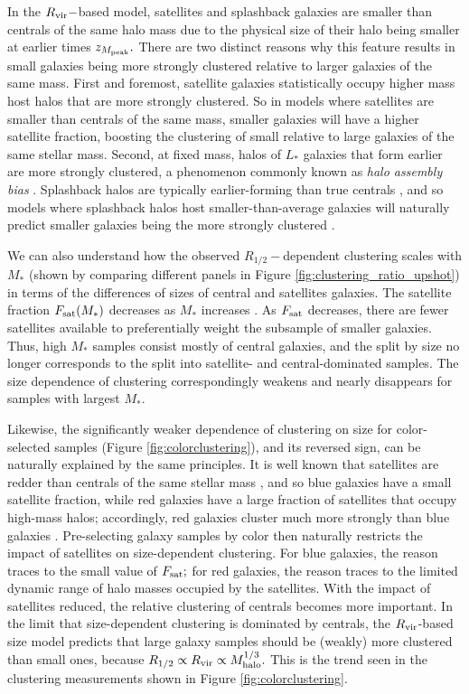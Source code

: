 \documentclass[usenatbib,usegraphicx,letterpaper]{mn2e}
\newcommand{\rhalf}{R_{1/2}}
\newcommand{\mstar}{M_{\ast}}
\newcommand{\zpeak}{z_{M_{\rm peak}}}
\newcommand{\mhalo}{M_{\rm halo}}
\newcommand{\rvir}{R_{\rm vir}}
\begin{document}
In the $\rvir-$based model, satellites and splashback galaxies are smaller than centrals of the same halo mass due to the physical size of their halo being smaller at earlier times $\zpeak.$ There are two distinct reasons why this feature results in small galaxies being more strongly clustered relative to larger galaxies of the same mass. First and foremost, satellite galaxies statistically occupy higher mass host halos that are more strongly clustered. So in models where satellites are smaller than centrals of the same mass, smaller galaxies will have a higher satellite fraction, boosting the clustering of small relative to large galaxies of the same stellar mass. Second, at fixed mass, halos of $L_\ast$ galaxies that form earlier are more strongly clustered, a phenomenon commonly known as {\em halo assembly bias} \citep{gao_white05,wechsler_etal06}. Splashback halos are typically earlier-forming than true centrals \citep{wang_etal09}, and so models where splashback halos host smaller-than-average galaxies will naturally predict smaller galaxies being the more strongly clustered \citep[see][for an example of the splashback-dependence of halo clustering]{sunayama_etal16}.

We can also understand how the observed $\rhalf-$dependent clustering scales with $\mstar$ (shown by comparing different panels in Figure \ref{fig:clustering_ratio_upshot}) in terms of the differences of sizes of central and satellites galaxies. The satellite fraction $F_{\rm sat}(\mstar)$ decreases as $\mstar$ increases \citep[e.g.,][]{guo_etal11,reddick_etal13}. As $F_{\rm sat}$ decreases, there are fewer satellites available to preferentially weight the subsample of smaller galaxies. Thus,  high $\mstar$ samples consist mostly of central galaxies, and the split by size no longer corresponds to the split into satellite- and central-dominated samples. The size dependence of clustering correspondingly weakens and nearly disappears for samples with largest $\mstar$.

Likewise, the significantly weaker dependence of clustering on size for color-selected samples (Figure \ref{fig:colorclustering}), and its reversed sign, can be naturally explained by the same principles.  It is well known that satellites are redder than centrals of the same stellar mass \citep[e.g.,][]{vdB_etal08}, and so blue galaxies have a small satellite fraction, while red galaxies have a large fraction of satellites that occupy high-mass halos; accordingly, red galaxies cluster much more strongly than blue galaxies \citep[e.g.,][]{zehavi_etal11}. Pre-selecting galaxy samples by color then naturally restricts the impact of satellites on size-dependent clustering. For blue galaxies, the reason traces to the small value of $F_{\rm sat};$ for red galaxies, the reason traces to the limited dynamic range of halo masses occupied by the satellites. With the impact of satellites reduced, the relative clustering of centrals becomes more important. In the limit that size-dependent clustering is dominated by centrals, the $\rvir$-based size model predicts that large galaxy samples should be (weakly) more clustered than small ones, because $\rhalf\propto\rvir\propto\mhalo^{1/3}.$ This is the trend seen in the clustering measurements shown in Figure \ref{fig:colorclustering}.
\end{document}
